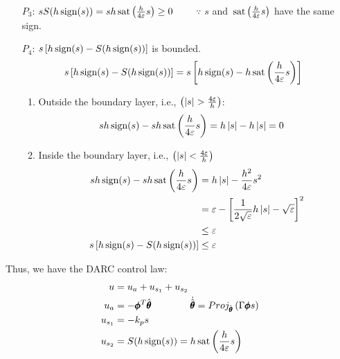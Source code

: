 \begin{itemize}
\item[$P_3$:] $s S(h \,\text{sign}(s)) = s h \,\text{sat} \left( \frac{h}{4 \varepsilon} s \right) \geq
0 \qquad $ $\because$ $s$ and $\,\text{sat} \left( \frac{h}{4 \varepsilon} s \right)$ have the
same sign.

\item[$P_4$:] $s \left[h \,\text{sign}(s) - S(h\,\text{sign}(s)) \right]$ is bounded.\\
\begin{align*}
    s \left[h \,\text{sign}(s) - S(h\,\text{sign}(s)) \right] &= s \left[h \,\text{sign}(s) - h \,\text{sat} \left( \frac{h}{4 \varepsilon} s \right) \right]
\end{align*}
\begin{enumerate}
\item Outside the boundary layer, i.e., $\left( \left\lvert s \right\rvert > \frac{4 \varepsilon}{h}
 \right)$:
\begin{align*}
    sh \,\text{sign}(s) - s h \,\text{sat} \left( \frac{h}{4 \varepsilon} s \right) &= h \left\lvert s \right\rvert - h\left\lvert s \right\rvert = 0
\end{align*}

\item Inside the boundary layer, i.e., $\left( \left\lvert s \right\rvert < \frac{4 \varepsilon}{h} \right)$
\begin{align*}
    sh \,\text{sign}(s) - s h \,\text{sat} \left( \frac{h}{4 \varepsilon} s \right) &= h \left\lvert s \right\rvert - \frac{h^2}{4 \varepsilon} s^2\\
    &= \varepsilon - \left[ \frac{1}{2 \sqrt{\varepsilon}} h \left\lvert s \right\rvert - \sqrt{\varepsilon} \right]^2\\
    &\leq \varepsilon\\
    s \left[h \,\text{sign}(s) - S(h\,\text{sign}(s)) \right] &\leq \varepsilon
\end{align*}
\end{enumerate}
\end{itemize}

Thus, we have the DARC control law:
\begin{align*}
    u &= u_a + u_{s_1} + u_{s_2}\\
    u_a &= - \pmb \phi^T \hat{\pmb \theta} \qquad  \qquad
    \dot{\hat{\pmb \theta}} = Proj_{\hat{\pmb \theta}} \left( \Gamma \pmb \phi s \right)\\
    u_{s_1} &= -k_p s\\
    u_{s_2} &= S(h \,\text{sign}(s)) = h \,\text{sat} \left( \frac{h}{4 \varepsilon} s \right)
\end{align*}
